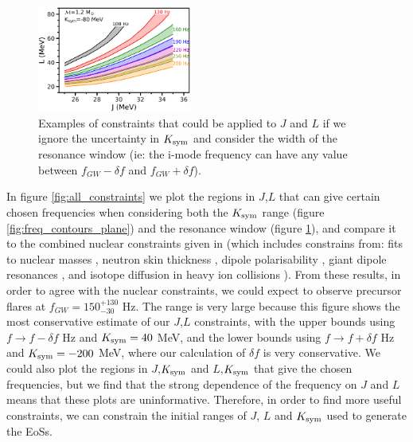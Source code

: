 \documentclass[fleqn,usenatbib]{mnras}
\begin{document}
\begin{figure}
\centering
\includegraphics[width=0.45\textwidth,angle=0]{JL_dfspread.png}
\caption{Examples of constraints that could be applied to $J$ and $L$ if we ignore the uncertainty in $K_{\rm sym}$ and consider the width of the resonance window (ie: the i-mode frequency can have any value between $f_{GW}-\delta f$ and $f_{GW}+\delta f$).}
\label{fig:t_res_spread}
\end{figure}


In figure \ref{fig:all_constraints} we plot the regions in $J$,$L$ that can give certain chosen frequencies when considering both the $K_{\rm sym}$ range (figure \ref{fig:freq_contours_plane}) and the resonance window (figure \ref{fig:t_res_spread}), and compare it to the combined nuclear constraints given in \citet{lattimer2013constraining} (which includes constrains from: fits to nuclear masses \citep{kortelainen2010nuclear}, neutron skin thickness \citep{chen2010density}, dipole polarisability \citep{piekarewicz2012electric}, giant dipole resonances \citep{trippa2008giant}, and isotope diffusion in heavy ion collisions \citep{tsang2009constraints}). From these results, in order to agree with the nuclear constraints, we could expect to observe precursor flares at $f_{GW}=150^{+130}_{-30}$ Hz. The range is very large because this figure shows the most conservative estimate of our $J$,$L$ constraints, with the upper bounds using $f\rightarrow f-\delta f$ Hz and $K_{\rm sym}=40$ MeV, and the lower bounds using $f\rightarrow f+\delta f$ Hz and $K_{\rm sym}=-200$ MeV, where our calculation of $\delta f$ is very conservative. We could also plot the regions in $J$,$K_{\rm sym}$ and $L$,$K_{\rm sym}$ that give the chosen frequencies, but we find that the strong dependence of the frequency on $J$ and $L$ means that these plots are uninformative. Therefore, in order to find more useful constraints, we can constrain the initial ranges of $J$, $L$ and $K_{\rm sym}$ used to generate the EoSs.
\end{document}
